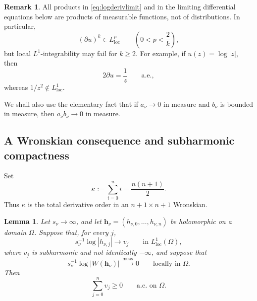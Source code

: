 \documentclass[12pt,letterpaper,reqno]{amsart}
\newtheorem{lem}[thm]{Lemma}
\theoremstyle{definition}
\newtheorem{rem}[thm]{Remark}
\numberwithin{equation}{section}
\newcommand{\loc}{\mathrm{loc}}
\newcommand{\convmeas}{\xrightarrow{\,\mathrm{meas}\,}}
\newcommand{\hv}{\bm h}
\begin{document}
\begin{rem}\label{rem:measurable-products}
All products in \eqref{eq:logderivlimit} and in the limiting differential
equations below are products of measurable functions, not of distributions.
In particular,
\[
(\partial u)^k\in L^p_{\loc}
 \qquad
 \left(0<p<\frac2k\right),
\]
but local \(L^1\)-integrability may fail for \(k\ge2\). For example, if
\(u(z)=\log|z|\), then
\[
 2\partial u=\frac1z
 \qquad\text{a.e.},
\]
whereas \(1/z^2\notin L^1_{\loc}\).

We shall also use the elementary fact that if \(a_\nu\to0\) in measure and
\(b_\nu\) is bounded in measure, then \(a_\nu b_\nu\to0\) in measure.
\end{rem}


\subsection{A Wronskian consequence and subharmonic compactness}

Set
\[
\kappa:=\sum_{i=0}^{n}i=\frac{n(n+1)}2.
\]
Thus \(\kappa\) is the total derivative order in an \({n+1}\times {n+1}\)
Wronskian.

\begin{lem}\label{lem:sum}
Let \(s_\nu\to\infty\), and let
\(\hv_\nu=(h_{\nu,0},\ldots,h_{\nu,n})\) be holomorphic on a domain
\(\Omega\). Suppose that, for every \(j\),
\begin{equation}\label{eq:component-log-limits}
 s_\nu^{-1}\log|h_{\nu,j}|
 \longrightarrow v_j
 \qquad\text{in }L^1_{\loc}(\Omega),
\end{equation}
where \(v_j\) is subharmonic and not identically \(-\infty\), and suppose that
\begin{equation}\label{eq:small-wronskian-local}
 s_\nu^{-1}\log|W(\hv_\nu)|
 \convmeas0
 \qquad\text{locally in }\Omega.
\end{equation}
Then
\begin{equation}\label{eq:sum-positive}
 \sum_{j=0}^{n}v_j\ge0
 \qquad\text{a.e.\ on }\Omega.
\end{equation}
\end{lem}
\end{document}
